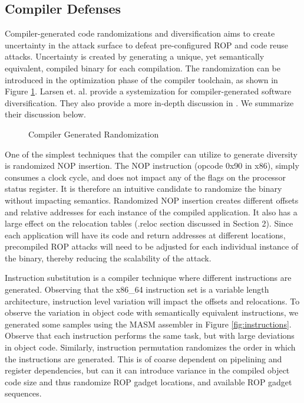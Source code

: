 \documentclass[preprint,12pt]{elsarticle}
\begin{document}
\subsection{Compiler Defenses}

Compiler-generated code randomizations and diversification aims to create uncertainty in the attack surface to defeat pre-configured ROP and code reuse attacks. Uncertainty is created by generating a unique, yet semantically equivalent, compiled binary for each compilation. The randomization can be introduced in the optimization phase of the compiler toolchain, as shown in Figure \ref{fig:compiler}. Larsen et. al. \cite{larsen2014sokautomated} provide a systemization for compiler-generated software diversification. They also provide a more in-depth discussion in \cite{larsen2015automated}. We summarize their discussion below. 

\begin{figure}[ht]
\centering{}
\caption{Compiler Generated Randomization}
\label{fig:compiler}
\end{figure}

One of the simplest techniques that the compiler can utilize to generate diversity is randomized NOP insertion. The NOP instruction (opcode 0x90 in x86), simply consumes a clock cycle, and does not impact any of the flags on the processor status register. It is therefore an intuitive candidate to randomize the binary without impacting semantics. Randomized NOP insertion creates different offsets and relative addresses for each instance of the compiled application. It also has a large effect on the relocation tables (.reloc section discussed in Section 2). Since each application will have its code and return addresses at different locations, precompiled ROP attacks will need to be adjusted for each individual instance of the binary, thereby reducing the scalability of the attack.

Instruction substitution is a compiler technique where different instructions are generated. Observing that the x86\_64 instruction set is a variable length architecture, instruction level variation will impact the offsets and relocations. To observe the variation in object code with semantically equivalent instructions, we generated some samples using the MASM assembler in Figure \ref{fig:instructions}. Observe that each instruction performs the same task, but with large deviations in object code. Similarly, instruction permutation randomizes the order in which the instructions are generated. This is of coarse dependent on pipelining and register dependencies, but can it can introduce variance in the compiled object code size and thus randomize ROP gadget locations, and available ROP gadget sequences.
\end{document}
